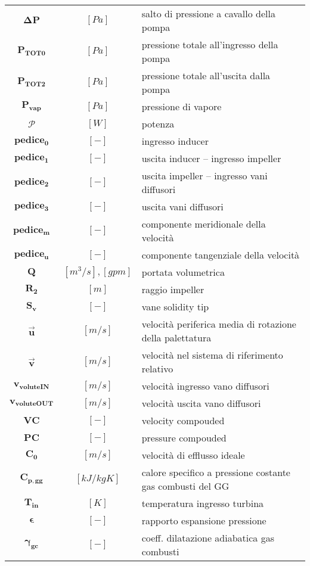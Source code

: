 \begin{multicols}{2}
{\begin{xltabular}{\linewidth}{cc>{\raggedright\arraybackslash}X}
		$\bm{\Delta P}$ & $[Pa]$ & salto di pressione a cavallo della pompa \\
		$\bm{P_{TOT 0}}$ & $[Pa]$ & pressione totale all'ingresso della pompa \\
        $\bm{P_{TOT 2}}$ & $[Pa]$ & pressione totale all'uscita dalla pompa \\
	    $\bm{P_{vap}}$ & $[Pa]$ & pressione di vapore \\
		$\bm{\mathcal{P}}$ & $[W]$ & potenza \\
		$\bm{pedice_0}$ & $[-]$ & ingresso inducer \\
        $\bm{pedice_1}$ & $[-]$ & uscita inducer – ingresso impeller \\
        $\bm{pedice_2}$ & $[-]$ & uscita impeller – ingresso vani diffusori \\
		$\bm{pedice_3}$ & $[-]$ & uscita vani diffusori \\
		$\bm{pedice_m}$ & $[-]$ & componente meridionale della velocità \\
        $\bm{pedice_u}$ & $[-]$ & componente tangenziale della velocità \\
        $\bm{Q}$ & $[m^3/s], [gpm]$ & portata volumetrica \\
		$\bm{R_2}$ & $[m]$ & raggio impeller \\
		$\bm{S_v}$ & $[-]$ & vane solidity tip \\
        $\bm{\overrightarrow{u}}$ & $[m/s]$ & velocità periferica media di rotazione della palettatura \\
        $\bm{\overrightarrow{v}}$ & $[m/s]$ & velocità nel sistema di riferimento relativo \\
		$\bm{{v_{voluteIN}}}$ & $[m/s]$ & velocità ingresso vano diffusori \\
		$\bm{{v_{voluteOUT}}}$ & $[m/s]$ & velocità uscita vano diffusori \\
		$\bm{VC}$ & $[-]$ & velocity compouded\\
		$\bm{PC}$ & $[-]$ & pressure compouded\\
		$\bm{C_0}$ & $[m/s]$ & velocità di efflusso ideale\\
		$\bm{C_{p,gg}}$ & $[kJ/kgK]$ & calore specifico a pressione costante gas combusti del GG\\
		$\bm{T_{in}}$ & $[K]$ & temperatura ingresso turbina\\
		$\bm{\epsilon}$ & $[-]$ & rapporto espansione pressione\\
		$\bm{\gamma_{gc}}$ & $[-]$ & coeff. dilatazione adiabatica gas combusti \\

\end{xltabular}}
\end{multicols}
